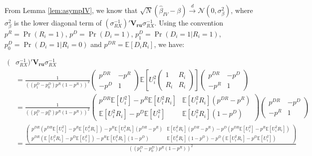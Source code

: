 \documentclass[]{book}
\newcommand{\esp}[1]{\mathbb{E}[ #1 ]}
\theoremstyle{definition}
\theoremstyle{definition}
\theoremstyle{definition}
\theoremstyle{remark}
\begin{document}
From Lemma \ref{lem:asympIV}, we know that \(\sqrt{N}(\hat{\beta}_{IV}-\beta)\stackrel{d}{\rightarrow}\mathcal{N}(0,\sigma^2_{\beta})\), where \(\sigma^2_{\beta}\) is the lower diagonal term of \((\sigma_{RX}^{-1})'\mathbf{V_{ru}}\sigma_{RX}^{-1}\).
Using the convention \(p^R=\Pr(R_i=1)\), \(p^D=\Pr(D_i=1)\), \(p^D_1=\Pr(D_i=1|R_i=1)\), \(p^D_0=\Pr(D_i=1|R_i=0)\) and \(p^{DR}=\esp{D_iR_i}\), we have:

\begin{align*}
(&\sigma_{RX}^{-1})'\mathbf{V_{ru}}\sigma_{RX}^{-1} \\
                   & = \frac{1}{((p^D_1-p^D_0)p^R(1-p^R))^2}
                  \left(\begin{array}{cc}
                         p^{DR}  & -p^R\\
                        -p^D & 1
                          \end{array}\right)
                          \esp{U_i^2\left(\begin{array}{cc}  1 & R_i\\  R_i & R_i\end{array}\right)}
                        \left(\begin{array}{cc}
                                         p^{DR}  & -p^D\\
                                          -p^R & 1
                          \end{array}\right)\\
                    & = \frac{1}{((p^D_1-p^D_0)p^R(1-p^R))^2}
                         \left(\begin{array}{cc}
                         p^{DR}\esp{U_i^2}-p^R\esp{U_i^2R_i} & \esp{U_i^2R_i}(p^{DR}-p^R)\\
                        \esp{U_i^2R_i}-p^D\esp{U_i^2} & \esp{U_i^2R_i}(1-p^D)
                          \end{array}\right)
                          \left(\begin{array}{cc}
                                         p^{DR}  & -p^D\\
                                          -p^R & 1
                          \end{array}\right)\\
                    & = \frac{\left(\begin{array}{cc}
                          p^{DR}(p^{DR}\esp{U_i^2}-p^R\esp{U_i^2R_i})- p^R\esp{U_i^2R_i}(p^{DR}-p^R)
                            & \esp{U_i^2R_i}(p^{DR}-p^R)-p^{D}(p^{DR}\esp{U_i^2}-p^R\esp{U_i^2R_i})\\
                          p^{DR}(\esp{U_i^2R_i}-p^D\esp{U_i^2})-p^R\esp{U_i^2R_i}(1-p^D)
                            & \esp{U_i^2R_i}(1-p^D) - p^{D}(\esp{U_i^2R_i}-p^D\esp{U_i^2})
                          \end{array}\right)}{((p^D_1-p^D_0)p^R(1-p^R))^2}
 \end{align*}
\end{document}
